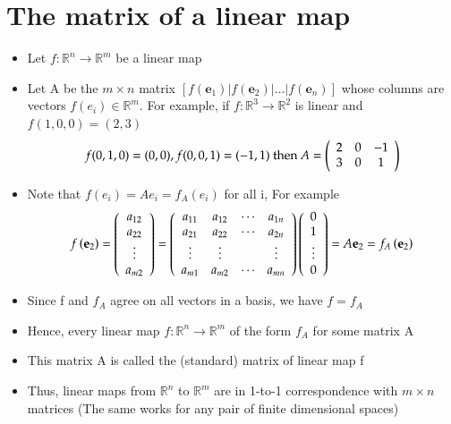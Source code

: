 \documentclass{article}[18pt]
\begin{document}
\section{The matrix of a linear map}
\begin{itemize}
	\item Let $f: \mathbb{R}^n\rightarrow \mathbb{R}^m$ be a linear map
	\item Let A be the $m\times n$ matrix $\left[ f \left( \mathbf { e } _ { 1 } \right) \left| f \left( \mathbf { e } _ { 2 } \right) \right| \ldots | f \left( \mathbf { e } _ { n } \right) \right]$ whose columns are vectors $f(e_i)\in \mathbb{R}^m$. For example, if $f:\mathbb{R}^3\rightarrow \mathbb{R}^2$ is linear and $f(1,0,0)=(2,3)$
	$$f ( 0,1,0 ) = ( 0,0 ) , f ( 0,0,1 ) = ( - 1,1 ) \text { then } A = \left( \begin{array} { c c c } { 2 } & { 0 } & { - 1 } \\ { 3 } & { 0 } & { 1 } \end{array} \right)$$
	\item Note that $f(e_i)=Ae_i=f_A(e_i)$ for all i, For example
	$$f \left( \mathbf { e } _ { 2 } \right) = \left( \begin{array} { c } { a _ { 12 } } \\ { a _ { 22 } } \\ { \vdots } \\ { a _ { m 2 } } \end{array} \right) = \left( \begin{array} { c c c c } { a _ { 11 } } & { a _ { 12 } } & { \cdots } & { a _ { 1 n } } \\ { a _ { 21 } } & { a _ { 22 } } & { \cdots } & { a _ { 2 n } } \\ { \vdots } & { \vdots } & { } & { \vdots } \\ { a _ { m 1 } } & { a _ { m 2 } } & { \cdots } & { a _ { m n } } \end{array} \right) \left( \begin{array} { c } { 0 } \\ { 1 } \\ { \vdots } \\ { 0 } \end{array} \right) = A \mathbf { e } _ { 2 } = f _ { A } \left( \mathbf { e } _ { 2 } \right)$$
	\item Since f and $f_A$ agree on all vectors in a basis, we have $f=f_A$
	\item Hence, every linear map $f:\mathbb{R}^n\rightarrow \mathbb{R}^m$ of the form $f_A$ for some matrix A
	\item This matrix A is called the (standard) matrix of linear map f
	\item Thus, linear maps from $\mathbb{R}^n$ to $\mathbb{R}^m$ are in 1-to-1 correspondence with $m\times n$ matrices (The same works for any pair of finite dimensional spaces)
\end{itemize}
\end{document}
